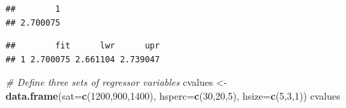 \documentclass[]{book}
\newenvironment{Shaded}{\begin{snugshade}}{\end{snugshade}}
\newcommand{\CommentTok}[1]{\textcolor[rgb]{0.56,0.35,0.01}{\textit{#1}}}
\newcommand{\DataTypeTok}[1]{\textcolor[rgb]{0.13,0.29,0.53}{#1}}
\newcommand{\DecValTok}[1]{\textcolor[rgb]{0.00,0.00,0.81}{#1}}
\newcommand{\KeywordTok}[1]{\textcolor[rgb]{0.13,0.29,0.53}{\textbf{#1}}}
\newcommand{\NormalTok}[1]{#1}
\newcommand{\StringTok}[1]{\textcolor[rgb]{0.31,0.60,0.02}{#1}}
\begin{document}
\begin{verbatim}
##        1 
## 2.700075
\end{verbatim}

\begin{Shaded}
\end{Shaded}

\begin{verbatim}
##        fit      lwr      upr
## 1 2.700075 2.661104 2.739047
\end{verbatim}

\begin{Shaded}
\begin{Highlighting}[]
\CommentTok{# Define three sets of regressor variables}
\NormalTok{cvalues <-}\StringTok{ }\KeywordTok{data.frame}\NormalTok{(}\DataTypeTok{sat=}\KeywordTok{c}\NormalTok{(}\DecValTok{1200}\NormalTok{,}\DecValTok{900}\NormalTok{,}\DecValTok{1400}\NormalTok{), }\DataTypeTok{hsperc=}\KeywordTok{c}\NormalTok{(}\DecValTok{30}\NormalTok{,}\DecValTok{20}\NormalTok{,}\DecValTok{5}\NormalTok{), }
                      \DataTypeTok{hsize=}\KeywordTok{c}\NormalTok{(}\DecValTok{5}\NormalTok{,}\DecValTok{3}\NormalTok{,}\DecValTok{1}\NormalTok{))}
\NormalTok{cvalues}
\end{Highlighting}
\end{Shaded}
\end{document}
